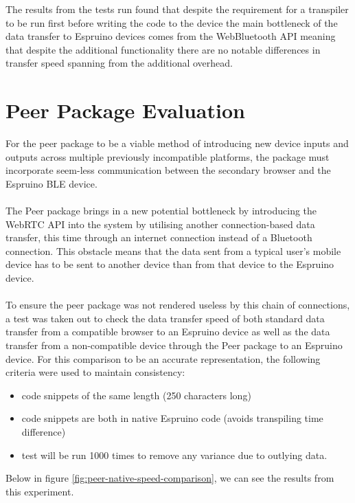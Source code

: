 \documentclass{l4proj}
\begin{document}
The results from the tests run found that despite the requirement for a transpiler to be run first before writing the code to the device the main bottleneck of the data transfer to Espruino devices comes from the WebBluetooth API meaning that despite the additional functionality there are no notable differences in transfer speed spanning from the additional overhead.

\section{Peer Package Evaluation}

For the peer package to be a viable method of introducing new device inputs and outputs across multiple previously incompatible platforms, the package must incorporate seem-less communication between the secondary browser and the Espruino BLE device.
\\ \\
The Peer package brings in a new potential bottleneck by introducing the WebRTC API into the system by utilising another connection-based data transfer, this time through an internet connection instead of a Bluetooth connection. This obstacle means that the data sent from a typical user's mobile device has to be sent to another device than from that device to the Espruino device.
\\ \\ 
To ensure the peer package was not rendered useless by this chain of connections, a test was taken out to check the data transfer speed of both standard data transfer from a compatible browser to an Espruino device as well as the data transfer from a non-compatible device through the Peer package to an Espruino device. For this comparison to be an accurate representation, the following criteria were used to maintain consistency:

\begin{itemize}
    \item code snippets of the same length (250 characters long)
    \item code snippets are both in native Espruino code (avoids transpiling time difference)
    \item test will be run 1000 times to remove any variance due to outlying data.
\end{itemize}

Below in figure \ref{fig:peer-native-speed-comparison}, we can see the results from this experiment.
\end{document}
